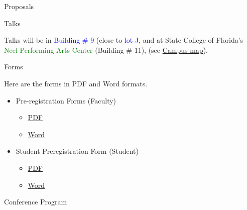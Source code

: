 \documentclass[final,hyperref={pdfpagelabels=false},12pt]{beamer}
\let\olditem\item
\renewcommand{\item}{\olditem\justifying}
\begin{document}
\begin{frame}[t]
\begin{columns}[t]
\begin{column}{.465\textwidth}
\begin{block}{Proposals}
\end{block}


\begin{block}{Talks}

Talks will be in \textcolor{blue}{Building \# 9} (close to \textcolor{blue}{lot J}, and at State College of Florida's \textcolor{green}{Neel Performing Arts Center} (Building \# 11), (see \href{cmap.jpg}{Campus map}). 

\end{block}


\begin{block}{Forms}

Here are the forms in PDF and Word formats.

\begin{itemize}

\item Pre-registration Forms (Faculty)
    \begin{itemize}
\item \href{preregistration_f.pdf}{PDF}    
\item \href{preregistration_f.docx}{Word} 
    \end{itemize}           
                        
\item Student Preregistration Form (Student)
    \begin{itemize}
\item \href{preregistration_s.pdf}{PDF} 
\item \href{preregistration_s.docx}{Word} 
   \end{itemize}


\end{itemize}



\end{block}

\begin{block}{Conference Program}


\end{block}
\end{column}
\end{columns}
\end{frame}
\end{document}
